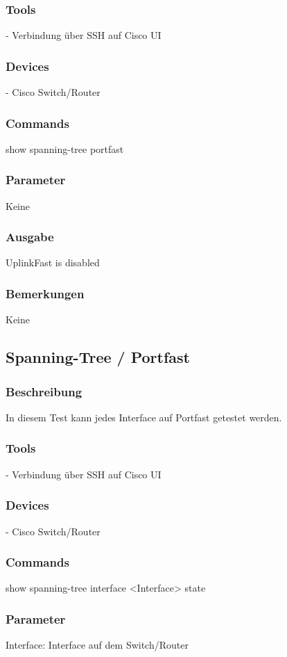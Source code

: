 \documentclass[a4,12pt]{scrartcl}
\begin{document}
\subsubsection{Tools}
- Verbindung über SSH auf Cisco UI 
\subsubsection{Devices}
- Cisco Switch/Router
\subsubsection{Commands}
show spanning-tree portfast
\subsubsection{Parameter}
Keine
\subsubsection{Ausgabe}
UplinkFast is disabled
\subsubsection{Bemerkungen}
Keine


\subsection{Spanning-Tree / Portfast}
\subsubsection{Beschreibung}
In diesem Test kann jedes Interface auf Portfast getestet werden.
\subsubsection{Tools}
- Verbindung über SSH auf Cisco UI 
\subsubsection{Devices}
- Cisco Switch/Router
\subsubsection{Commands}
show spanning-tree interface <Interface> state
\subsubsection{Parameter}
Interface: Interface auf dem Switch/Router
\end{document}
